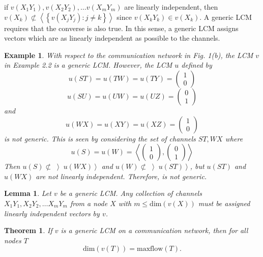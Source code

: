 \documentclass[journal]{IEEEtran}
\newtheorem{theo}[prop]{Theorem}
\newtheorem{exam}[prop]{Example}
\newtheorem{lemm}[prop]{Lemma}
\begin{document}
\par
if $v(X_1Y_1), v(X_2Y_2), \dots v(X_mY_m)$ are linearly independent, then $v(X_k)\nsubset \left \langle \left \{ v(X_jY_j):j \neq k\right \} \right \rangle$ since $v(X_kY_k)\in v(X_k)$. A generic LCM requires that the converse is also true. In this sense, a generic LCM assigns vectors which are as linearly independent as possible to the channels.

\begin{exam}
	With respect to the communication network in Fig. 1(b), the LCM $v$ in Example 2.2 is a generic LCM. However, the LCM $u$ defined by
	$$ u(ST)=u(TW)=u(TY)=\begin{pmatrix} 1 \\ 0 \end{pmatrix}$$
	$$ u(SU)=u(UW)=u(UZ)=\begin{pmatrix} 0 \\ 1 \end{pmatrix}$$
	and
	$$ u(WX)=u(XY)=u(XZ)=\begin{pmatrix} 1 \\ 0 \end{pmatrix}$$
	is not generic. This is seen by considering the set of channels ${ST,WX}$ where
	$$u(S)=u(W)=\left \langle \begin{pmatrix} 1 \\ 0 \end{pmatrix}, \begin{pmatrix} 0 \\ 1 \end{pmatrix} \right \rangle$$
	Then $u(S)\nsubset \left \rangle u(WX) \right \rangle$ and $u(W)\nsubset \left \rangle u(ST) \right \rangle$, but $u(ST)$ and $u(WX)$ are not linearly independent. Therefore, is not generic.
\end{exam}


\begin{lemm}
	Let $v$ be a generic LCM. Any collection of channels $X_1Y_1, X_2Y_2, \dots X_mY_m$ from a node $X$ with $m \leq \text{dim}(v(X))$ must be assigned linearly independent vectors by $v$.
\end{lemm}


\begin{theo}
	If $v$ is a generic LCM on a communication network, then for all nodes $T$
	$$\text{dim}(v(T))=\text{maxflow}(T).$$
\end{theo}
\end{document}
